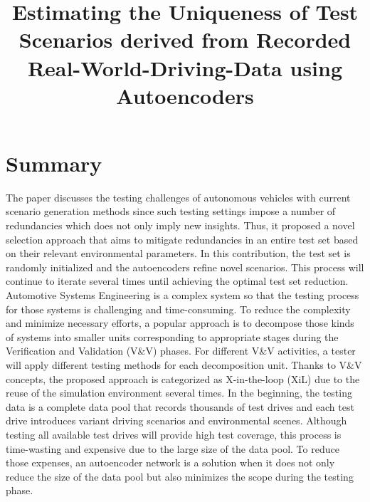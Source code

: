 \documentclass[10pt,a4paper]{report}
\title{Estimating the Uniqueness of Test Scenarios derived from Recorded Real-World-Driving-Data using Autoencoders}
\begin{document}
\begin{center}
\textbf{\thetitle}
\end{center}


\section{Summary}
The paper discusses the testing challenges of autonomous vehicles with current scenario generation methods since such testing settings impose a number of redundancies which does not only imply new insights.
%
Thus, it proposed a novel selection approach that aims to mitigate redundancies in an entire test set based on their relevant environmental parameters.
%
In this contribution, the test set is randomly initialized and the autoencoders refine novel scenarios.
%
This process will continue to iterate several times until achieving the optimal test set reduction.
%
Automotive Systems Engineering is a complex system so that the testing process for those systems is challenging and time-consuming.
%
To reduce the complexity and minimize necessary efforts, a popular approach is to decompose those kinds of systems into smaller units corresponding to appropriate stages during the Veriﬁcation and Validation (V\&V) phases.
%
For different V\&V activities, a tester will apply different testing methods for each decomposition unit.
%
Thanks to V\&V concepts, the proposed approach is categorized as X-in-the-loop (XiL) due to the reuse of the simulation environment several times.
%
In the beginning, the testing data is a complete data pool that records thousands of test drives and each test drive introduces variant driving scenarios and environmental scenes.
%
Although testing all available test drives will provide high test coverage, this process is time-wasting and expensive due to the large size of the data pool. 
%
To reduce those expenses, an autoencoder network is a solution when it does not only reduce the size of the data pool but also minimizes the scope during the testing phase.
\end{document}
